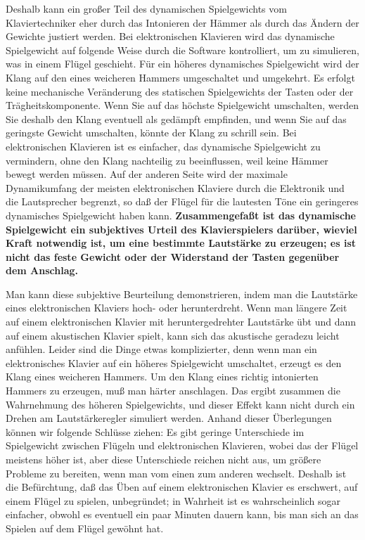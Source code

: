 Deshalb kann ein großer Teil des dynamischen Spielgewichts vom Klaviertechniker eher durch das Intonieren der Hämmer als durch das Ändern der Gewichte justiert werden.
Bei elektronischen Klavieren wird das dynamische Spielgewicht auf folgende Weise durch die Software kontrolliert, um zu simulieren, was in einem Flügel geschieht.
Für ein höheres dynamisches Spielgewicht wird der Klang auf den eines weicheren Hammers umgeschaltet und umgekehrt.
Es erfolgt keine mechanische Veränderung des statischen Spielgewichts der Tasten oder der Trägheitskomponente.
Wenn Sie auf das höchste Spielgewicht umschalten, werden Sie deshalb den Klang eventuell als gedämpft empfinden, und wenn Sie auf das geringste Gewicht umschalten, könnte der Klang zu schrill sein.
Bei elektronischen Klavieren ist es einfacher, das dynamische Spielgewicht zu vermindern, ohne den Klang nachteilig zu beeinflussen, weil keine Hämmer bewegt werden müssen.
Auf der anderen Seite wird der maximale Dynamikumfang der meisten elektronischen Klaviere durch die Elektronik und die Lautsprecher begrenzt, so daß der Flügel für die lautesten Töne ein geringeres dynamisches Spielgewicht haben kann.
\textbf{Zusammengefaßt ist das dynamische Spielgewicht ein subjektives Urteil des Klavierspielers darüber, wieviel Kraft notwendig ist, um eine bestimmte Lautstärke zu erzeugen; es ist nicht das feste Gewicht oder der Widerstand der Tasten gegenüber dem Anschlag.}

Man kann diese subjektive Beurteilung demonstrieren, indem man die Lautstärke eines elektronischen Klaviers hoch- oder herunterdreht.
Wenn man längere Zeit auf einem elektronischen Klavier mit heruntergedrehter Lautstärke übt und dann auf einem  akustischen Klavier spielt, kann sich das akustische geradezu leicht anfühlen.
Leider sind die Dinge etwas komplizierter, denn wenn man ein elektronisches Klavier auf ein höheres Spielgewicht umschaltet, erzeugt es den Klang eines weicheren Hammers.
Um den Klang eines richtig intonierten Hammers zu erzeugen, muß man härter anschlagen.
Das ergibt zusammen die Wahrnehmung des höheren Spielgewichts, und dieser Effekt kann nicht durch ein Drehen am Lautstärkeregler simuliert werden.
Anhand dieser Überlegungen können wir folgende Schlüsse ziehen:
Es gibt geringe Unterschiede im Spielgewicht zwischen Flügeln und elektronischen Klavieren, wobei das der Flügel meistens höher ist, aber diese Unterschiede reichen nicht aus, um größere Probleme zu bereiten, wenn man vom einen zum anderen wechselt.
Deshalb ist die Befürchtung, daß das Üben auf einem elektronischen Klavier es erschwert, auf einem Flügel zu spielen, unbegründet; in Wahrheit ist es wahrscheinlich sogar einfacher, obwohl es eventuell ein paar Minuten dauern kann, bis man sich an das Spielen auf dem Flügel gewöhnt hat.

